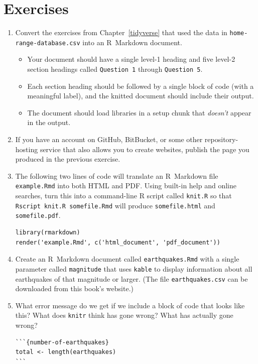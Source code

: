 \section{Exercises}

\begin{enumerate}

\item
  Convert the exercises from Chapter~\ref{tidyverse} that used the data in \texttt{home-range-database.csv}
  into an R~Markdown document.
  \begin{itemize}
    \item
      Your document should have a single level-1 heading
      and five level-2 section headings called \texttt{Question~1} through \texttt{Question~5}.
    \item
      Each section heading should be followed by a single block of code (with a meaningful label),
      and the knitted document should include their output.
    \item
      The document should load libraries in a setup chunk that \emph{doesn't} appear in the output.
  \end{itemize}

\item
  If you have an account on GitHub, BitBucket, or some other repository-hosting service
  that also allows you to create websites,
  publish the page you produced in the previous exercise.

\item
  The following two lines of code will translate an R~Markdown file \texttt{example.Rmd} into both HTML and PDF.
  Using built-in help and online searches,
  turn this into a command-line R script called \texttt{knit.R}
  so that \texttt{Rscript knit.R somefile.Rmd}
  will produce \texttt{somefile.html} and \texttt{somefile.pdf}.

\begin{lstlisting}
library(rmarkdown)
render('example.Rmd', c('html_document', 'pdf_document'))
\end{lstlisting}

\item
  Create an R~Markdown document called \texttt{earthquakes.Rmd}
  with a single parameter called \texttt{magnitude}
  that uses \texttt{kable} to display information about
  all earthquakes of that magnitude or larger.
  (The file \texttt{earthquakes.csv} can be downloaded from this book's website.)

\item
  What error message do we get if we include a block of code that looks like this?
  What does \texttt{knitr} think has gone wrong?
  What has actually gone wrong?

\begin{lstlisting}
```{number-of-earthquakes}
total <- length(earthquakes)
```
\end{lstlisting}

\end{enumerate}
